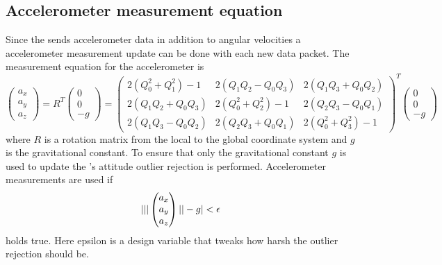 \subsection{Accelerometer measurement equation}
Since the \abbrIMU sends accelerometer data in addition to angular velocities a accelerometer measurement update can be done with each new \abbrIMU data packet. The measurement equation for the accelerometer is
\begin{equation}
    \begin{pmatrix}
    a_x\\
    a_y\\
    a_z
    \end{pmatrix}
    =
    R^T
    \begin{pmatrix}
    0\\
    0\\
    -g
    \end{pmatrix}
    =
    \begin{pmatrix}
        2(Q_0^2+Q_1^2) - 1 &  2(Q_1 Q_2-Q_0 Q_3) &    2(Q_1 Q_3+Q_0 Q_2)\\
        2(Q_1 Q_2+Q_0 Q_3) &    2(Q_0^2+Q_2^2) - 1 &  2(Q_2 Q_3-Q_0 Q_1)\\
        2(Q_1 Q_3-Q_0 Q_2) &    2(Q_2 Q_3+Q_0 Q_1) &    2(Q_0^2+Q_3^2) - 1
    \end{pmatrix}^T
    \begin{pmatrix}
        0\\
        0\\
        -g
    \end{pmatrix}
\end{equation}
    where $R$ is a rotation matrix from the local to the global coordinate system and $g$ is the gravitational constant. To ensure that only the gravitational constant $g$ is used to update the \abbrROV's attitude outlier rejection is performed. Accelerometer measurements are used if 
\begin{align*}
    | ||
    \begin{pmatrix}
        a_x\\
        a_y\\
        a_z
    \end{pmatrix}||
    -g
     | < \epsilon
\end{align*} holds true.
Here epsilon is a design variable that tweaks how harsh the outlier rejection should be.

